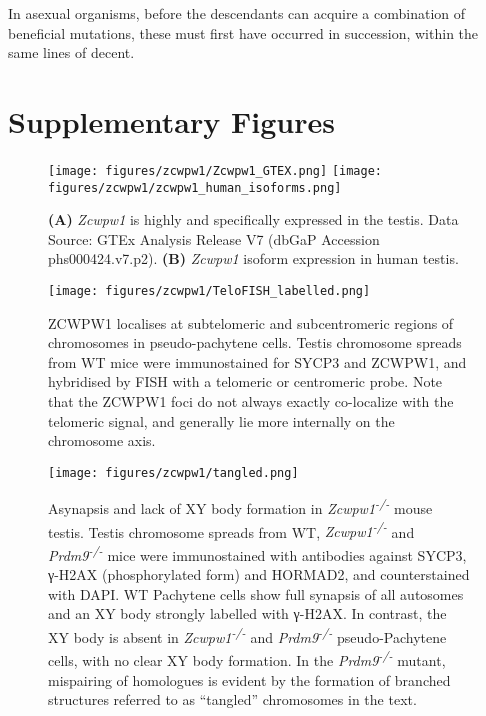 \begin{savequote}[8cm]
In asexual organisms, before the descendants can acquire a combination of beneficial mutations, these must first have occurred in succession, within the same lines of decent.
\end{savequote}

\chapter{\label{app:1-A}Supplementary Figures}

\minitoc



\begin{figure}[H]
	\centering
	\texttt{[image: figures/zcwpw1/Zcwpw1\_GTEX.png]}
	\texttt{[image: figures/zcwpw1/zcwpw1\_human\_isoforms.png]}
	\caption[\textit{Zcwpw1} Tissue and Isoform expression]{
		\textbf{(A)} \textit{Zcwpw1} is highly and specifically expressed in the testis.
			Data Source: GTEx Analysis Release V7 (dbGaP Accession phs000424.v7.p2).
		\textbf{(B)} \textit{Zcwpw1} isoform expression in human testis.
	}
	\label{fig:isoforms}
\end{figure}


\begin{figure}[H]
	\centering
	\texttt{[image: figures/zcwpw1/TeloFISH\_labelled.png]}
	\caption[Telomeric Localisation]{
		ZCWPW1 localises at subtelomeric and subcentromeric regions of chromosomes in pseudo-pachytene cells.
		Testis chromosome spreads from WT mice were immunostained for SYCP3 and ZCWPW1, and hybridised by FISH with a telomeric or centromeric probe.
		Note that the ZCWPW1 foci do not always exactly co-localize with the telomeric signal, and generally lie more internally on the chromosome axis.
	}
	\label{fig:telofish}
\end{figure}


\begin{figure}[H]
	\centering
	\texttt{[image: figures/zcwpw1/tangled.png]}
	\caption[Tangled Chromosome Phenotype]{
		Asynapsis and lack of XY body formation in \textit{Zcwpw1\textsuperscript{-/-}} mouse testis.
		Testis chromosome spreads from WT, \textit{Zcwpw1\textsuperscript{-/-}} and \textit{Prdm9\textsuperscript{-/-}} mice were immunostained with antibodies against SYCP3, γ-H2AX (phosphorylated form) and HORMAD2, and counterstained with DAPI.
		WT Pachytene cells show full synapsis of all autosomes and an XY body strongly labelled with γ-H2AX.
		In contrast, the XY body is absent in \textit{Zcwpw1\textsuperscript{-/-}} and \textit{Prdm9\textsuperscript{-/-}} pseudo-Pachytene cells, with no clear XY body formation.
		In the \textit{Prdm9\textsuperscript{-/-}} mutant, mispairing of homologues is evident by the formation of branched structures referred to as “tangled” chromosomes in the text.
	}
	\label{fig:tangled}
\end{figure}


